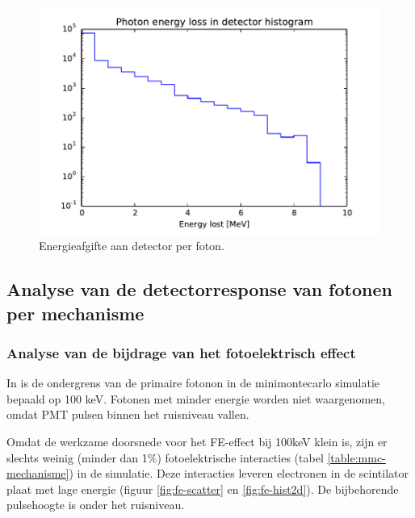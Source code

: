 \documentclass[a4paper,11pt]{article}
\begin{document}
\begin{figure}[t]
  \begin{center}
    \includegraphics{fig-Eloss-hist.pdf}
    \caption{\label{fig:Eloss-hist} Energieafgifte aan detector per foton.}
  \end{center}
\end{figure}


\subsection{Analyse van de detectorresponse van fotonen per mechanisme}

\subsubsection{Analyse van de bijdrage van het fotoelektrisch effect}
In \citep*{Steijger2010-gammas} is de ondergrens van de primaire fotonon in de minimontecarlo simulatie bepaald op 100 keV. Fotonen met minder energie worden niet waargenomen, omdat PMT pulsen binnen het ruisniveau vallen.

Omdat de werkzame doorsnede voor het FE-effect bij 100keV klein is, zijn er slechts weinig (minder dan 1\%) fotoelektrische interacties (tabel  \ref{table:mmc-mechanisme}) in de simulatie. Deze interacties leveren electronen in de scintilator plaat met lage energie (figuur \ref{fig:fe-scatter} en \ref{fig:fe-hist2d}). De bijbehorende pulsehoogte is onder het ruisniveau.
\end{document}
